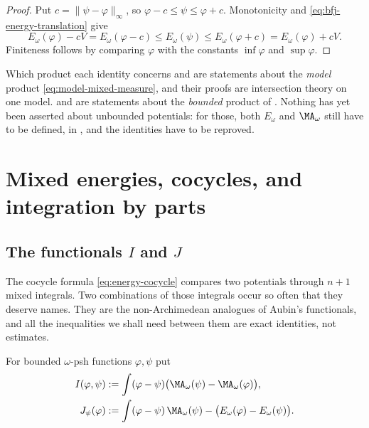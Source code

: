 \begin{proof}
Put $c=\lVert\psi-\varphi\rVert_\infty$, so $\varphi-c\leq\psi\leq\varphi+c$.
Monotonicity and \eqref{eq:bfj-energy-translation} give
\[
 E_\omega(\varphi)-cV=E_\omega(\varphi-c)
 \leq E_\omega(\psi)\leq E_\omega(\varphi+c)=E_\omega(\varphi)+cV .
\]
Finiteness follows by comparing $\varphi$ with the constants
$\inf\varphi$ and $\sup\varphi$.
\end{proof}

\begin{warning}{Which product each identity concerns}
 and  are statements about
the \emph{model} product \eqref{eq:model-mixed-measure}, and their proofs are
intersection theory on one model.   and
 are statements about the \emph{bounded}
product of .  Nothing has yet been asserted
about unbounded potentials: for those, both $E_\omega$ and
$\MA_\omega$ still have to be defined, in
, and the identities have to
be reproved.
\end{warning}

\section{Mixed energies, cocycles, and integration by parts}
\label{sec:ch26-mixed}

\subsection{The functionals \texorpdfstring{$I$}{I} and
\texorpdfstring{$J$}{J}}
\label{sec:ch26-ij-def}

The cocycle formula \eqref{eq:energy-cocycle} compares two potentials through
$n+1$ mixed integrals.  Two combinations of those integrals occur so often
that they deserve names.  They are the non-Archimedean analogues of Aubin's
functionals, and all the inequalities we shall need between them are exact
identities, not estimates.

\begin{definition}
\label{def:ch26-ij}
For bounded $\omega$-psh functions $\varphi,\psi$ put
\begin{align}
\label{eq:ch26-I-definition}
 I(\varphi,\psi)
 &:=\int(\varphi-\psi)\bigl(\MA_\omega(\psi)-\MA_\omega(\varphi)\bigr),\\
\label{eq:ch26-J-definition}
 J_\psi(\varphi)
 &:=\int(\varphi-\psi)\,\MA_\omega(\psi)
    -\bigl(E_\omega(\varphi)-E_\omega(\psi)\bigr).
\end{align}
\end{definition}

